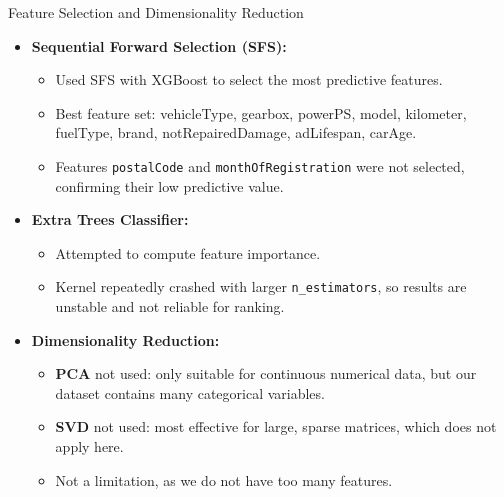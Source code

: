 \documentclass{beamer}
\begin{document}
\begin{frame}{Feature Selection and Dimensionality Reduction}
        \begin{itemize}
                \item \textbf{Sequential Forward Selection (SFS):}
                        \begin{itemize}
                                \item Used SFS with XGBoost to select the most
                                        predictive features.
                                \item Best feature set: vehicleType, gearbox,
                                        powerPS, model, kilometer, fuelType,
                                        brand, notRepairedDamage, adLifespan,
                                        carAge.
                                \item Features \texttt{postalCode} and
                                        \texttt{monthOfRegistration} were not
                                        selected, confirming their low
                                        predictive value.
                        \end{itemize}
                \item \textbf{Extra Trees Classifier:}
                        \begin{itemize}
                                \item Attempted to compute feature importance.
                                \item Kernel repeatedly crashed with larger
                                        \texttt{n\_estimators}, so results are
                                        unstable and not reliable for ranking.
                        \end{itemize}
                \item \textbf{Dimensionality Reduction:}
                        \begin{itemize}
                                \item \textbf{PCA} not used: only suitable for
                                        continuous numerical data, but our
                                        dataset contains many categorical
                                        variables.
                                \item \textbf{SVD} not used: most effective for
                                        large, sparse matrices, which does not
                                        apply here.
                                \item Not a limitation, as we do not have too
                                        many features.
                        \end{itemize}
        \end{itemize}
\end{frame}
\end{document}
